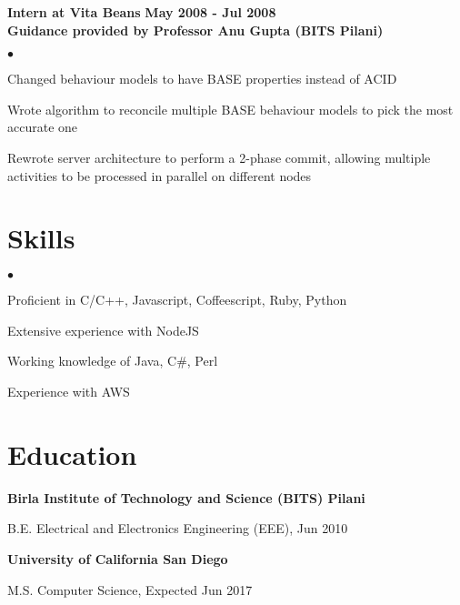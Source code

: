 \documentclass[margin,line]{res}
\newenvironment{list1}{
  \begin{list}{\ding{113}}{%
      \setlength{\itemsep}{0in}
      \setlength{\parsep}{0in} \setlength{\parskip}{0in}
      \setlength{\topsep}{0in} \setlength{\partopsep}{0in}
      \setlength{\leftmargin}{0.17in}}}{\end{list}}
\newenvironment{list2}{
  \begin{list}{$\bullet$}{%
      \setlength{\itemsep}{0in}
      \setlength{\parsep}{0in} \setlength{\parskip}{0in}
      \setlength{\topsep}{0in} \setlength{\partopsep}{0in}
      \setlength{\leftmargin}{0.2in}}}{\end{list}}
\begin{document}
\begin{resume}
{\bf Intern at Vita Beans} \hfill {\bf May 2008 - Jul 2008} \\
{\bf Guidance provided by Professor Anu Gupta (BITS Pilani)}
\vspace*{.05in}
\begin{list2}
\item Changed behaviour models to have BASE properties instead of ACID
\item Wrote algorithm to reconcile multiple BASE behaviour models to pick the most accurate one
\item Rewrote server architecture to perform a 2-phase commit, allowing multiple activities to be processed in parallel on different nodes
\end{list2}

\section{\sc Skills}
\begin{list2}
\item Proficient in C/C++, Javascript, Coffeescript, Ruby, Python
\item Extensive experience with NodeJS
\item Working knowledge of Java, C\#, Perl
\item Experience with AWS
\end{list2}

\section{\sc Education}
{\bf Birla Institute of Technology and Science (BITS) Pilani} \\
\vspace*{-.1in}
\begin{list1}
\item[] B.E. Electrical and Electronics Engineering (EEE), Jun 2010
\end{list1}

{\bf University of California San Diego} \\
\vspace*{-.1in}
\begin{list1}
\item[] M.S. Computer Science, Expected Jun 2017
\end{list1}


\end{resume}
\end{document}
